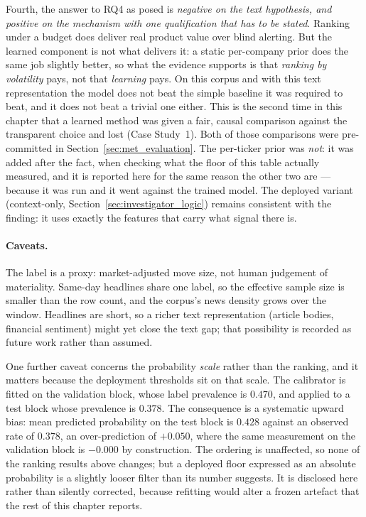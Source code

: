 Fourth, the answer to \gls{RQ}4 as posed is \emph{negative on the text hypothesis, and positive on
the mechanism with one qualification that has to be stated}. Ranking under a budget does deliver
real product value over blind alerting. But the learned component is not what delivers it: a static
per-company prior does the same job slightly better, so what the evidence supports is that
\emph{ranking by volatility} pays, not that \emph{learning} pays. On this corpus and with this text
representation the model does not beat the simple baseline it was required to beat, and it does not
beat a trivial one either. This is the second time in this chapter that a learned method was given a
fair, causal comparison against the transparent choice and lost (Case Study~1). Both of those
comparisons were pre-committed in Section~\ref{sec:met_evaluation}. The per-ticker prior was
\emph{not}: it was added after the fact, when checking what the floor of this table actually
measured, and it is reported here for the same reason the other two are --- because it was run and
it went against the trained model. The deployed variant (context-only,
Section~\ref{sec:investigator_logic}) remains consistent with the finding: it uses exactly the
features that carry what signal there is.

\paragraph{Caveats.} The label is a proxy: market-adjusted move size, not human judgement of
materiality. Same-day headlines share one label, so the effective sample size is smaller than the row
count, and the corpus's news density grows over the window. Headlines are short, so a richer text
representation (article bodies, financial sentiment) might yet close the text gap; that possibility
is recorded as future work rather than assumed.

One further caveat concerns the probability \emph{scale} rather than the ranking, and it matters
because the deployment thresholds sit on that scale. The calibrator is fitted on the validation
block, whose label prevalence is $0.470$, and applied to a test block whose prevalence is $0.378$.
The consequence is a systematic upward bias: mean predicted probability on the test block is
$0.428$ against an observed rate of $0.378$, an over-prediction of $+0.050$, where the same
measurement on the validation block is $-0.000$ by construction. The ordering is unaffected, so
none of the ranking results above changes; but a deployed floor expressed as an absolute
probability is a slightly looser filter than its number suggests. It is disclosed here rather than
silently corrected, because refitting would alter a frozen artefact that the rest of this chapter
reports.

